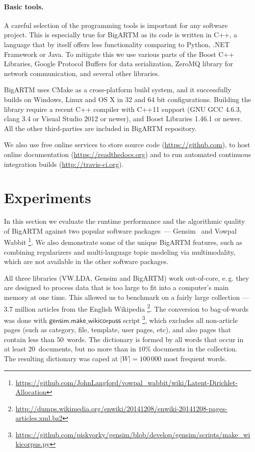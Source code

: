\documentclass[russian]{llncs}
\newcommand{\kw}[1]{\textsf{#1}}
\begin{document}
\paragraph{Basic tools.}
A careful selection of the programming tools is important for any software project.
This is especially true for BigARTM as its code is written in C++,
a language that by itself offers less functionality comparing to Python, .NET Framework or Java.
To mitigate this we use
various parts of the Boost C++ Libraries,
Google Protocol Buffers for data serialization,
ZeroMQ library for network communication,
and several other libraries.

BigARTM uses CMake as a cross-platform build system,
and it successfully builds on Windows, Linux and OS X in 32 and 64 bit configurations.
Building the library require a recent C++ compiler with C++11 support (GNU GCC 4.6.3, clang 3.4 or Visual Studio 2012 or newer),
and Boost Libraries 1.46.1 or newer. All the other third-parties are included in BigARTM repository.

We also use free online services
to store source code (\url{https://github.com}),
to host online documentation (\url{https://readthedocs.org}) and
to run automated continuous integration builds (\url{http://travis-ci.org}).

\section{Experiments}
\label{sec:Experiments}

In this section we evaluate the runtime performance and the algorithmic quality of \mbox{BigARTM}
against two popular software packages~---
Gensim~\cite{rehurek_lrec}
and Vowpal Wabbit%
\footnote{\url{https://github.com/JohnLangford/vowpal_wabbit/wiki/Latent-Dirichlet-Allocation}}.
We also demonstrate some of the unique BigARTM features, such as
combining regularizers and multi-language topic modeling via multimodality,
which are not available in the other software packages.

All three libraries (VW.LDA, Gensim and BigARTM) work out-of-core,
e.\,g. they are designed to process data that is too large to fit into a computer's main memory at one time.
This allowed us to benchmark on a fairly large collection --- 3.7 million articles from the English Wikipedia%
\footnote{\url{http://dumps.wikimedia.org/enwiki/20141208/enwiki-20141208-pages-articles.xml.bz2}}.
The conversion to bag-of-words was done with $\kw{gensim.make\_wikicorpuss}$ script%
\footnote{\url{https://github.com/piskvorky/gensim/blob/develop/gensim/scripts/make_wikicorpus.py}},
which excludes all non-article pages (such as category, file, template, user pages, etc),
and also pages that contain less than $50$~words.
The dictionary is formed by all words that occur in at least 20~documents,
but no more than in $10\%$ documents in the collection.
The resulting dictionary was caped at $|W| = 100\,000$ most frequent words.
\end{document}
